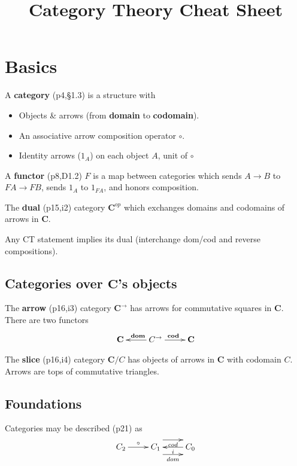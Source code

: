 \documentclass[10pt,twocolumn,letterpaper]{article}
\title{Category Theory Cheat Sheet}
\newcommand{\defn}[1]{{\bf #1}}
\begin{document}


\section{Basics}

  A \defn{category} (p4,\S1.3) is a structure with
  \begin{itemize}
    \item Objects \& arrows (from \defn{domain} to \defn{codomain}).
    \item An associative arrow composition operator $\circ$.
    \item Identity arrows ($1_A$) on each object $A$, unit of $\circ$
  \end{itemize}

  A \defn{functor} (p8,D1.2) $F$ is a map between categories which
     sends $A \to B$ to $FA \to FB$, sends $1_A$ to $1_{FA}$, and honors composition.

  The \defn{dual} (p15,i2) category $\mathbf{C}^{op}$ which
    exchanges domains and codomains of arrows in $\mathbf{C}$.

  Any CT statement implies its dual (interchange dom/cod and reverse compositions).

  \subsection{Categories over $\mathbf{C}$'s objects}

  The \defn{arrow} (p16,i3) category $\mathbf{C}^\to$ has arrows
     for commutative squares in $\mathbf{C}$.  There are two functors
     \[\xymatrix{ \mathbf{C} & \ar[l]_{\mathbf{dom}} C^\to \ar[r]^{\mathbf{cod}} & \mathbf{C}}\]

  The \defn{slice} (p16,i4) category $\mathbf{C}/C$ has objects
     of arrows in $\mathbf{C}$ with codomain $C$.  Arrows are tops of commutative triangles.

  \subsection{Foundations}

  Categories may be described (p21) as
     \[\xymatrix{ C_2 \ar[r]^\circ & C_1 \ar@<2ex>[r]_{cod} \ar@<-2ex>[r]_{dom} & C_0 \ar[l]^i }\]
\end{document}
